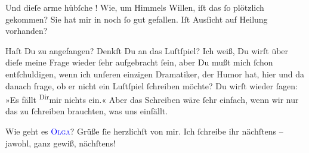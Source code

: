\pstart
           Und dieſe arme hübſche \label{K_L03204-32v}\label{K_L03204-32h}! Wie, um Himmels Willen,
               iſt das ſo plötzlich gekommen? Sie hat mir in \label{K_L03204-112v}\label{K_L03204-112h} noch ſo gut gefallen. Iſt Ausſicht auf Heilung vorhanden?\pend
           
\pstart
           Haſt Du zu \label{K_L03204-332v}\label{K_L03204-332h}
               angefangen? Denkſt Du an das Luſtſpiel? Ich weiß, Du wirſt über dieſe meine Frage
               wieder ſehr aufgebracht ſein, aber Du mußt mich ſchon entſchuldigen, wenn ich unſeren
               einzigen  Dramatiker, der \strikeout{\textcolor{gray}{h}\textcolor{gray}{×}\-\textcolor{gray}{×}\-\textcolor{gray}{×}\-\textcolor{gray}{×}\-\textcolor{gray}{×}} Humor hat, hier und da danach frage, {\pb}ob er
               nicht ein Luſtſpiel ſchreiben möchte? Du wirſt wieder ſagen: »Es fällt \substVorne{}\textsuperscript{Dir}\substDazwischen{}mir\substHinten{} nichts ein.«  Aber das  Schreiben wäre ſehr einfach, wenn wir nur das
               zu ſchreiben brauchten, was uns 
               einfällt.\pend
           
\pstart
           Wie geht es \textsc{\textcolor{blue}{Olga}{}\ledrightnote{\textcolor{blue}{Olga Schnitzler}}}? Grüße ſie herzlichſt von mir. Ich ſchreibe ihr nächſtens – jawohl, ganz gewiß,
               nächſtens!\pend
           
